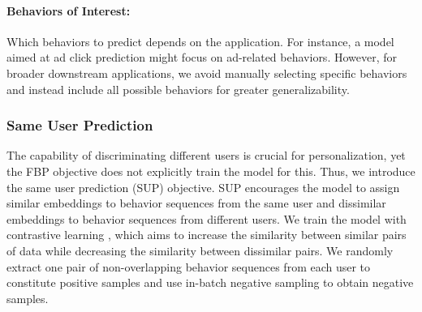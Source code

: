 \documentclass{article}
\begin{document}
    
    \paragraph{Behaviors of Interest:} Which behaviors to predict depends on the application. For instance, a model aimed at ad click prediction might focus on ad-related behaviors. However, for broader downstream applications, we avoid manually selecting specific behaviors and instead include all possible behaviors for greater generalizability. 
    

\subsubsection{Same User Prediction}

The capability of discriminating different users is crucial for personalization, yet the FBP objective does not explicitly train the model for this. Thus, we introduce the same user prediction (SUP) objective. SUP encourages the model to assign similar embeddings to behavior sequences from the same user and dissimilar embeddings to behavior sequences from different users. We train the model with contrastive learning \citep{simclr}, which aims to increase the similarity between similar pairs of data while decreasing the similarity between dissimilar pairs. We randomly extract one pair of non-overlapping behavior sequences from each user to constitute positive samples and use in-batch negative sampling to obtain negative samples.
\end{document}
